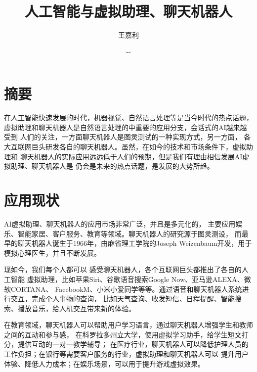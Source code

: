 \documentclass[UTF8]{ctexart}
\begin{document}


\renewcommand{\contentsname}{Contents}
\renewcommand{\bibname}{reference}

\renewcommand{\today}{\number\year-\number\month-\number\day}

\title{{\Huge 人工智能与虚拟助理、聊天机器人\linebreak\linebreak}}
\author{\Large 王嘉利 \\}
\date{\today}
\maketitle
\setcounter{secnumdepth}{4}
\tableofcontents


\section*{摘要} 

在人工智能快速发展的时代，机器视觉、自然语言处理等是当今时代的热点话题，
虚拟助理和聊天机器人是自然语言处理的中重要的应用分支，会话式的AI越来越受到
人们的关注，一方面聊天机器人是图灵测试的一种实现方式，另一方面，
各大互联网巨头研发各自的聊天机器人。虽然，在如今的技术和市场条件下，虚拟助理和
聊天机器人的实际应用远远低于人们的预期，但是我们有理由相信发展AI虚拟助理、聊天机器人是
仍会是未来的热点话题，是发展的大势所趋\cite{谢剑超2018发展}。


\section{应用现状}

AI虚拟助理、聊天机器人的应用市场非常广泛，并且是多元化的，
主要应用娱乐、智能家居、客户服务、教育等领域。聊天机器人的研究源于图灵测设，
而最早的聊天机器人诞生于1966年，由麻省理工学院的Joseph Weizenbaum开发，用于模拟心理医生，并且不断发展。


现如今，我们每个人都可以
感受聊天机器人，各个互联网巨头都推出了各自的人工智能
虚拟助理，比如苹果Siri、谷歌语音搜索Google Now、亚马逊ALEXA、微软CORTANA、
FacebookM、小米小爱同学等等。通过语音和聊天机器人系统进行交互，完成个人事物的查询，
比如天气查询、收发短信、日程提醒、智能搜索、播放音乐，给人机交互带来新的体验。

在教育领域，聊天机器人可以帮助用户学习语言，通过聊天机器人增强学生和教师之间的互动和参与感，
在科罗拉多州立大学，使用虚拟学习助手，给学生短文打分，提供互动的一对一教学辅导；
在医疗行业，聊天机器人可以降低护理人员的工作负担；在银行等需要客户服务的行业，虚拟助理和聊天机器人可以
提升用户体验、降低人力成本；在娱乐场景，可以用于提升游戏虚拟效果。
\end{document}
